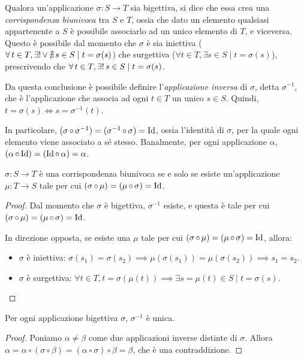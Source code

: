 Qualora un'applicazione $\sigma : S \to T$ sia bigettiva, si dice che essa
crea una \textit{corrispondenza biunivoca} tra $S$ e $T$, ossia che dato un
elemento qualsiasi appartenente a $S$ è possibile associarlo ad un unico elemento
di $T$, e viceversa. Questo è possibile dal momento che $\sigma$ è sia iniettiva
($\forall t \in T, \existsone \lor \nexists s \in S \mid t = \sigma(s)$) che
surgettiva ($\forall t \in T, \exists s \in S \mid t = \sigma(s)$), prescrivendo
che $\forall t \in T, \existsone s \in S \mid t = \sigma(s)$.

Da questa conclusione è possibile definire l'\textit{applicazione inversa} di
$\sigma$, detta $\sigma^{-1}$, che è l'applicazione che associa ad ogni $t \in T$
un unico $s \in S$. Quindi, $t = \sigma(s) \iff s = \sigma^{-1} (t)$.

In particolare, $(\sigma \circ \sigma^{-1}) = (\sigma^{-1} \circ \sigma) = \Id$,
ossia l'identità di $\sigma$, per la quale ogni elemento viene associato a sé stesso.
Banalmente, per ogni applicazione $\alpha$, $(\alpha \circ \Id) = (\Id \circ \alpha) = \alpha$.

\begin{lemma}
    $\sigma : S \to T$ è una corrispondenza biunivoca se e solo se
    esiste un'applicazione $\mu : T \to S$ tale per cui
    $(\sigma \circ \mu) = (\mu \circ \sigma) = \Id$.
\end{lemma}

\begin{proof}
    Dal momento che $\sigma$ è bigettiva, $\sigma^{-1}$ esiste, e questa è
    tale per cui $(\sigma \circ \mu) = (\mu \circ \sigma) = \Id$.

    In direzione opposta, se esiste una $\mu$ tale per cui $(\sigma \circ \mu) =
    (\mu \circ \sigma) = \Id$, allora:

    \begin{itemize}
        \item $\sigma$ è iniettiva: $\sigma(s_1) = \sigma(s_2) \implies
        \mu(\sigma(s_1)) = \mu(\sigma(s_2)) \implies s_1 = s_2$.
        \item $\sigma$ è surgettiva: $\forall t \in T, t = \sigma(\mu(t)) \implies
        \exists s = \mu(t) \in S \mid t = \sigma(s)$.
    \end{itemize}
\end{proof}

\begin{lemma}
    Per ogni applicazione bigettiva $\sigma$, $\sigma^{-1}$ è unica.
\end{lemma}

\begin{proof}
    Poniamo $\alpha \neq \beta$ come due applicazioni inverse distinte
    di $\sigma$. Allora $\alpha = \alpha \circ (\sigma \circ \beta) =
    (\alpha \circ \sigma) \circ \beta = \beta$, che è una contraddizione.
\end{proof}
